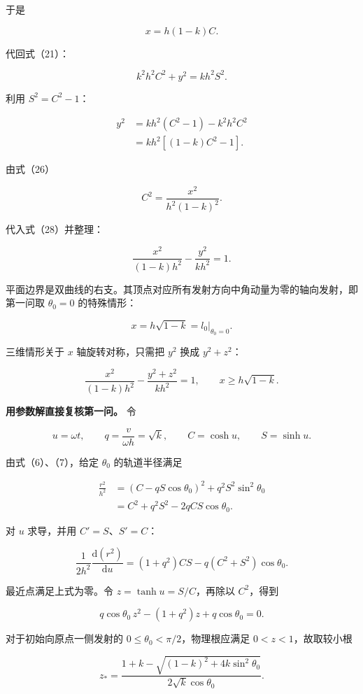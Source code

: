 \documentclass[12pt,a4paper,UTF8]{ctexart}
\begin{document}
于是

\[
x=h(1-k)C.
\tag{26}
\]

代回式（21）：

\[
k^2h^2C^2+y^2
=kh^2S^2.
\tag{27}
\]

利用 \(S^2=C^2-1\)：

\[
\begin{aligned}
y^2
&=kh^2(C^2-1)-k^2h^2C^2\\
&=kh^2\left[(1-k)C^2-1\right].
\end{aligned}
\tag{28}
\]

由式（26）

\[
C^2=\frac{x^2}{h^2(1-k)^2}.
\tag{29}
\]

代入式（28）并整理：

\[
\boxed{
\frac{x^2}{(1-k)h^2}
-\frac{y^2}{kh^2}=1
}.
\tag{30}
\]

平面边界是双曲线的右支。其顶点对应所有发射方向中角动量为零的轴向发射，即第一问取
\(\theta_0=0\) 的特殊情形：

\[
x=h\sqrt{1-k}=l_0\big|_{\theta_0=0}.
\tag{31}
\]

三维情形关于 \(x\) 轴旋转对称，只需把 \(y^2\) 换成 \(y^2+z^2\)：

\[
\boxed{
\frac{x^2}{(1-k)h^2}
-\frac{y^2+z^2}{kh^2}=1,
\qquad x\ge h\sqrt{1-k}
}.
\tag{32}
\]

\textbf{用参数解直接复核第一问。} 令

\[
u=\omega t,
\qquad q=\frac{v}{\omega h}=\sqrt{k},
\qquad C=\cosh u,
\qquad S=\sinh u.
\]

由式（6）、（7），给定 \(\theta_0\) 的轨道半径满足

\[
\begin{aligned}
\frac{r^2}{h^2}
&=\left(C-qS\cos\theta_0\right)^2
+q^2S^2\sin^2\theta_0\\
&=C^2+q^2S^2-2qCS\cos\theta_0.
\end{aligned}
\]

对 \(u\) 求导，并用 \(C'=S\)、\(S'=C\)：

\[
\frac{1}{2h^2}\frac{\mathrm d(r^2)}{\mathrm du}
=(1+q^2)CS-q(C^2+S^2)\cos\theta_0.
\]

最近点满足上式为零。令 \(z=\tanh u=S/C\)，再除以 \(C^2\)，得到

\[
q\cos\theta_0\,z^2-(1+q^2)z
+q\cos\theta_0=0.
\]

对于初始向原点一侧发射的 \(0\le\theta_0<\pi/2\)，物理根应满足
\(0<z<1\)，故取较小根

\[
z_*=\frac{1+k-\sqrt{(1-k)^2+4k\sin^2\theta_0}}
{2\sqrt{k}\cos\theta_0}.
\]
\end{document}
